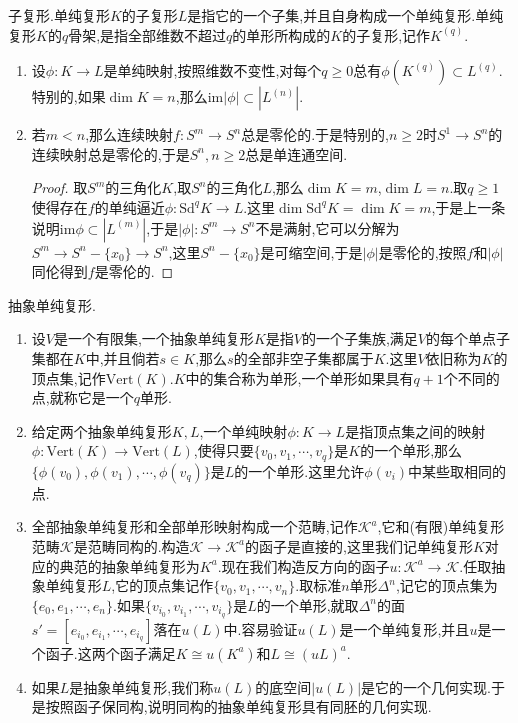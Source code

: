 子复形.单纯复形$K$的子复形$L$是指它的一个子集,并且自身构成一个单纯复形.单纯复形$K$的$q$骨架,是指全部维数不超过$q$的单形所构成的$K$的子复形,记作$K^{(q)}$.
\begin{enumerate}
	\item 设$\phi:K\to L$是单纯映射,按照维数不变性,对每个$q\ge0$总有$\phi(K^{(q)})\subset L^{(q)}$.特别的,如果$\dim K=n$,那么$\mathrm{im}|\phi|\subset|L^{(n)}|$.
	\item 若$m<n$,那么连续映射$f:S^m\to S^n$总是零伦的.于是特别的,$n\ge2$时$S^1\to S^n$的连续映射总是零伦的,于是$S^n,n\ge2$总是单连通空间.
	\begin{proof}
		
		取$S^m$的三角化$K$,取$S^n$的三角化$L$,那么$\dim K=m$,$\dim L=n$.取$q\ge1$使得存在$f$的单纯逼近$\phi:\mathrm{Sd}^qK\to L$.这里$\dim\mathrm{Sd}^qK=\dim K=m$,于是上一条说明$\mathrm{im}\phi\subset|L^{(m)}|$,于是$|\phi|:S^m\to S^n$不是满射,它可以分解为$S^m\to S^n-\{x_0\}\to S^n$,这里$S^n-\{x_0\}$是可缩空间,于是$|\phi|$是零伦的,按照$f$和$|\phi|$同伦得到$f$是零伦的.
	\end{proof}
\end{enumerate}

抽象单纯复形.
\begin{enumerate}
	\item 设$V$是一个有限集,一个抽象单纯复形$K$是指$V$的一个子集族,满足$V$的每个单点子集都在$K$中,并且倘若$s\in K$,那么$s$的全部非空子集都属于$K$.这里$V$依旧称为$K$的顶点集,记作$\mathrm{Vert}(K)$.$K$中的集合称为单形,一个单形如果具有$q+1$个不同的点,就称它是一个$q$单形.
	\item 给定两个抽象单纯复形$K,L$,一个单纯映射$\phi:K\to L$是指顶点集之间的映射$\phi:\mathrm{Vert}(K)\to\mathrm{Vert}(L)$,使得只要$\{v_0,v_1,\cdots,v_q\}$是$K$的一个单形,那么$\{\phi(v_0),\phi(v_1),\cdots,\phi(v_q)\}$是$L$的一个单形.这里允许$\phi(v_i)$中某些取相同的点.
	\item 全部抽象单纯复形和全部单形映射构成一个范畴,记作$\mathscr{K}^a$,它和(有限)单纯复形范畴$\mathscr{K}$是范畴同构的.构造$\mathscr{K}\to\mathscr{K}^a$的函子是直接的,这里我们记单纯复形$K$对应的典范的抽象单纯复形为$K^a$.现在我们构造反方向的函子$u:\mathscr{K}^a\to\mathscr{K}$.任取抽象单纯复形$L$,它的顶点集记作$\{v_0,v_1,\cdots,v_n\}$.取标准$n$单形$\Delta^n$,记它的顶点集为$\{e_0,e_1,\cdots,e_n\}$.如果$\{v_{i_0},v_{i_1},\cdots,v_{i_q}\}$是$L$的一个单形,就取$\Delta^n$的面$s'=[e_{i_0},e_{i_1},\cdots,e_{i_q}]$落在$u(L)$中.容易验证$u(L)$是一个单纯复形,并且$u$是一个函子.这两个函子满足$K\cong u(K^a)$和$L\cong(uL)^a$.
	\item 如果$L$是抽象单纯复形,我们称$u(L)$的底空间$|u(L)|$是它的一个几何实现.于是按照函子保同构,说明同构的抽象单纯复形具有同胚的几何实现.
\end{enumerate}

